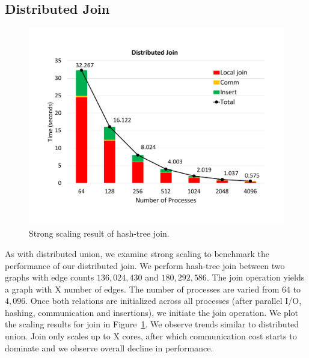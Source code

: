 

\subsection{Distributed Join}
\label{sec:join}

\begin{figure}[h]
	\includegraphics[width=\columnwidth]{results/join.pdf}
	\caption{Strong scaling result of hash-tree join.}
	\label{fig:dist_join}
\end{figure}

As with distributed union, we examine strong scaling to benchmark the performance of our distributed join.
We perform hash-tree join between two graphs with edge counts $136,\!024,\!430$ and $180,\!292,\!586$. The join operation yields a graph with X number of edges.
The number of processes are varied from $64$ to $4,096$. 
Once both relations are initialized across all processes (after parallel I/O, hashing, communication and insertions), we initiate the join operation. 
We plot the scaling results for join in Figure~\ref{fig:dist_join}. We observe trends similar to distributed union.
Join only scales up to X cores, after which communication cost starts to dominate and we observe overall decline in performance. %


